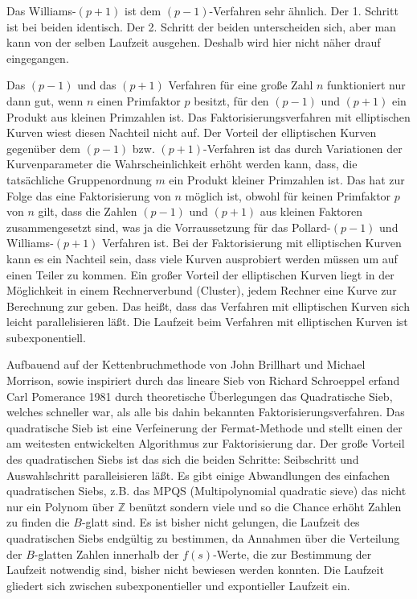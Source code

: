 \documentclass[a4paper,11pt]{article}
\begin{document}
Das Williams-$(p+1)$ ist dem $(p-1)$-Verfahren sehr ähnlich. Der 1. Schritt
ist bei beiden identisch. Der 2. Schritt der beiden unterscheiden sich, aber
man kann von der selben Laufzeit ausgehen. Deshalb wird hier nicht näher drauf
eingegangen.

Das $(p-1)$ und das $(p+1)$ Verfahren für eine große Zahl $n$ funktioniert
nur dann gut, wenn $n$ einen Primfaktor $p$ besitzt, für den $(p-1)$ und $(p+1)$
ein Produkt aus kleinen Primzahlen ist. Das Faktorisierungsverfahren mit 
elliptischen Kurven wiest diesen Nachteil nicht auf. Der Vorteil
der elliptischen Kurven gegenüber dem $(p-1)$ bzw. $(p+1)$-Verfahren ist das
durch Variationen der Kurvenparameter die Wahrscheinlichkeit erhöht werden kann,
 dass, die tatsächliche Gruppenordnung $m$ ein Produkt kleiner Primzahlen ist. 
Das hat zur Folge das eine Faktorisierung von $n$ möglich ist, obwohl für 
keinen Primfaktor $p$ von $n$ gilt, dass die Zahlen $(p-1)$ und $(p+1)$ aus 
kleinen Faktoren zusammengesetzt sind, was ja die Vorraussetzung für das 
Pollard-$(p-1)$ und Williams-$(p+1)$ Verfahren ist. Bei der Faktorisierung mit 
elliptischen Kurven kann es ein Nachteil sein, dass viele
Kurven ausprobiert werden müssen um auf einen Teiler zu kommen. 
Ein großer Vorteil der elliptischen
Kurven liegt in der Möglichkeit in einem Rechnerverbund (Cluster), jedem Rechner
eine Kurve zur Berechnung zur geben. Das heißt, dass das Verfahren mit
elliptischen Kurven sich leicht parallelisieren läßt. Die Laufzeit beim 
Verfahren mit elliptischen Kurven ist subexponentiell.


Aufbauend auf der Kettenbruchmethode von John Brillhart und Michael Morrison,
sowie inspiriert durch das lineare Sieb von Richard Schroeppel erfand Carl
Pomerance 1981 durch theoretische Überlegungen das Quadratische Sieb, welches
schneller war, als alle bis dahin bekannten Faktorisierungsverfahren.
Das quadratische Sieb ist eine Verfeinerung der Fermat-Methode und stellt einen
der am weitesten entwickelten Algorithmus zur Faktorisierung dar. Der große
Vorteil des quadratischen Siebs ist das sich die beiden Schritte: Seibschritt
und Auswahlschritt paralleisieren läßt. Es gibt einige Abwandlungen des einfachen
quadratischen Siebs, z.B. das MPQS (Multipolynomial quadratic sieve) das nicht nur
ein Polynom über $\mathbb Z$ benützt sondern viele und so die Chance erhöht
Zahlen zu finden die $B$-glatt sind. Es ist bisher nicht gelungen, die
Laufzeit des quadratischen Siebs endgültig zu bestimmen, da Annahmen über die
Verteilung der $B$-glatten Zahlen innerhalb der $f(s)$-Werte,
die zur Bestimmung der Laufzeit notwendig sind, bisher nicht
bewiesen werden konnten. Die Laufzeit gliedert sich zwischen subexponentieller
und expontieller Laufzeit ein.
\end{document}
